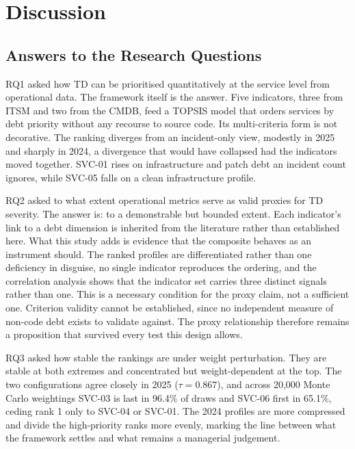 \documentclass[
  authoryear,
  preprint]{elsarticle}
\begin{document}
\section{Discussion}\label{sec-discussion}

\subsection{Answers to the Research
Questions}\label{answers-to-the-research-questions}

RQ1 asked how TD can be prioritised quantitatively at the service level
from operational data. The framework itself is the answer. Five
indicators, three from ITSM and two from the CMDB, feed a TOPSIS model
that orders services by debt priority without any recourse to source
code. Its multi-criteria form is not decorative. The ranking diverges
from an incident-only view, modestly in 2025 and sharply in 2024, a
divergence that would have collapsed had the indicators moved together.
SVC-01 rises on infrastructure and patch debt an incident count ignores,
while SVC-05 falls on a clean infrastructure profile.

RQ2 asked to what extent operational metrics serve as valid proxies for
TD severity. The answer is: to a demonstrable but bounded extent. Each
indicator's link to a debt dimension is inherited from the literature
rather than established here. What this study adds is evidence that the
composite behaves as an instrument should. The ranked profiles are
differentiated rather than one deficiency in disguise, no single
indicator reproduces the ordering, and the correlation analysis shows
that the indicator set carries three distinct signals rather than one.
This is a necessary condition for the proxy claim, not a sufficient one.
Criterion validity cannot be established, since no independent measure
of non-code debt exists to validate against. The proxy relationship
therefore remains a proposition that survived every test this design
allows.

RQ3 asked how stable the rankings are under weight perturbation. They
are stable at both extremes and concentrated but weight-dependent at the
top. The two configurations agree closely in 2025 (\(\tau = 0.867\)),
and across 20,000 Monte Carlo weightings SVC-03 is last in 96.4\% of
draws and SVC-06 first in 65.1\%, ceding rank 1 only to SVC-04 or
SVC-01. The 2024 profiles are more compressed and divide the
high-priority ranks more evenly, marking the line between what the
framework settles and what remains a managerial judgement.
\end{document}
